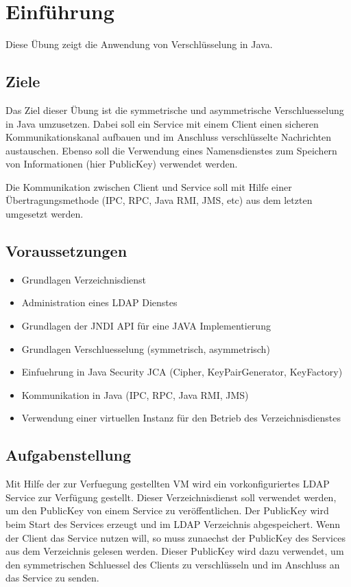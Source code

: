 
\section{Einführung}
Diese Übung zeigt die Anwendung von Verschlüsselung in Java.
\subsection{Ziele}
Das Ziel dieser Übung ist die symmetrische und asymmetrische Verschluesselung in Java umzusetzen. Dabei soll ein Service mit einem Client einen sicheren Kommunikationskanal aufbauen und im Anschluss verschlüsselte Nachrichten austauschen. Ebenso soll die Verwendung eines Namensdienstes zum Speichern von Informationen (hier PublicKey) verwendet werden.

Die Kommunikation zwischen Client und Service soll mit Hilfe einer Übertragungsmethode (IPC, RPC, Java RMI, JMS, etc) aus dem letzten umgesetzt werden.

\subsection{Voraussetzungen}
\begin{itemize}
	\item Grundlagen Verzeichnisdienst
	\item Administration eines LDAP Dienstes
	\item Grundlagen der JNDI API für eine JAVA Implementierung
	\item Grundlagen Verschluesselung (symmetrisch, asymmetrisch)
	\item Einfuehrung in Java Security JCA (Cipher, KeyPairGenerator, KeyFactory)
	\item Kommunikation in Java (IPC, RPC, Java RMI, JMS)
	\item Verwendung einer virtuellen Instanz für den Betrieb des Verzeichnisdienstes
\end{itemize}


\subsection{Aufgabenstellung}
Mit Hilfe der zur Verfuegung gestellten VM wird ein vorkonfiguriertes LDAP Service zur Verfügung gestellt. Dieser Verzeichnisdienst soll verwendet werden, um den PublicKey von einem Service zu veröffentlichen. Der PublicKey wird beim Start des Services erzeugt und im LDAP Verzeichnis abgespeichert. Wenn der Client das Service nutzen will, so muss zunaechst der PublicKey des Services aus dem Verzeichnis gelesen werden. Dieser PublicKey wird dazu verwendet, um den symmetrischen Schluessel des Clients zu verschlüsseln und im Anschluss an das Service zu senden.

